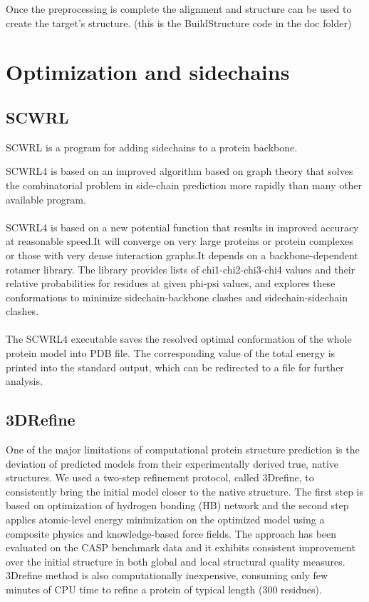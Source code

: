 \documentclass{article}
\begin{document}
Once the preprocessing is complete the alignment and structure can be used to create the target's structure. (this is the BuildStructure code in the doc folder)
\section{Optimization and sidechains}

\subsection{SCWRL}

SCWRL is a program for adding sidechains to a protein backbone.

SCWRL4 is based on an improved algorithm based on graph theory that solves the combinatorial problem in side-chain prediction more rapidly than many other available program.\\\\

SCWRL4 is based on a new potential function that results in improved accuracy at reasonable speed.It will converge on very large proteins or protein complexes or those with very dense interaction graphs.It depends on a backbone-dependent rotamer library. The library provides lists of chi1-chi2-chi3-chi4 values and their relative probabilities for residues at given phi-psi values, and explores these conformations to minimize sidechain-backbone clashes and sidechain-sidechain clashes.\\\\

The SCWRL4 executable saves the resolved optimal conformation of the whole protein model into PDB file. The corresponding value of the total energy is printed into the standard output, which can be redirected to a file for further analysis.

\subsection{3DRefine}

One of the major limitations of computational protein structure prediction is the deviation of predicted models from their experimentally derived true, native structures.
	We used a two-step refinement protocol, called 3Drefine, to consistently bring the initial model closer to the native structure. The first step is based on optimization of hydrogen bonding (HB) network and the second step applies atomic-level energy minimization on the optimized model using a composite physics and knowledge-based force fields. The approach has been evaluated on the CASP benchmark data and it exhibits consistent improvement over the initial structure in both global and local structural quality measures. 3Drefine method is also computationally inexpensive, consuming only few minutes of CPU time to refine a protein of typical length (300 residues).
\end{document}
